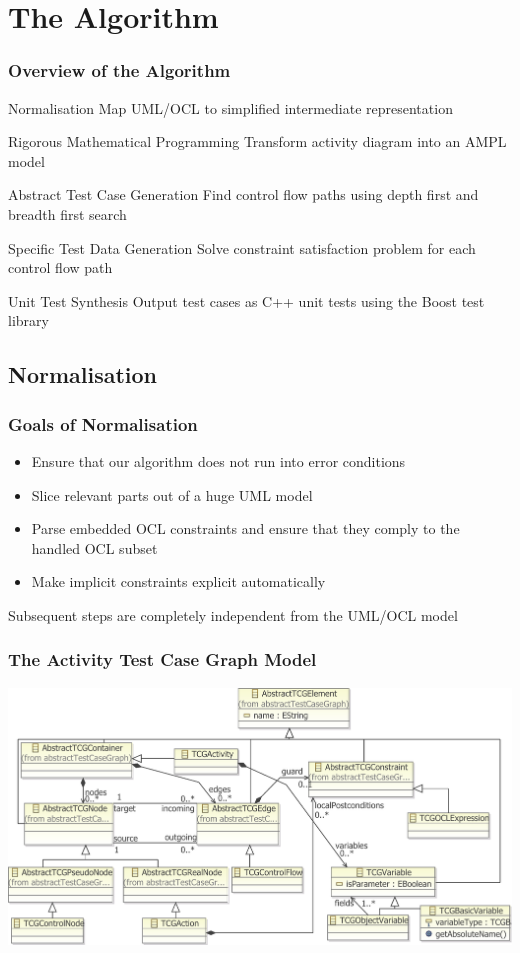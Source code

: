 \documentclass{beamer}
\begin{document}
\section{The Algorithm}
\begin{frame}
\frametitle{Overview of the Algorithm}
\begin{block}{Normalisation}
Map UML/OCL to simplified intermediate representation
\end{block}
\begin{block}{Rigorous Mathematical Programming}
Transform activity diagram into an AMPL model
\end{block}
\begin{block}{Abstract Test Case Generation}
Find control flow paths using depth first and breadth first search
\end{block}
\begin{block}{Specific Test Data Generation}
Solve constraint satisfaction problem for each control flow path
\end{block}
\begin{block}{Unit Test Synthesis}
Output test cases as C++ unit tests using the Boost test library
\end{block}
\end{frame}
\subsection{Normalisation}
\begin{frame}
\frametitle{Goals of Normalisation}
\begin{itemize}
  \item Ensure that our algorithm does not run into error conditions
  \item Slice relevant parts out of a huge UML model
  \item Parse embedded OCL constraints and ensure that they comply to the handled OCL subset
  \item Make implicit constraints explicit automatically
\end{itemize}
\begin{block}{}
Subsequent steps are completely independent from the UML/OCL model
\end{block}
\end{frame}
\begin{frame}
\frametitle{The Activity Test Case Graph Model}
	\includegraphics[width=\textwidth]{../IntermediatePresentation/pics/completeMetamodelforSlideshowN.pdf}
\end{frame}
\end{document}
